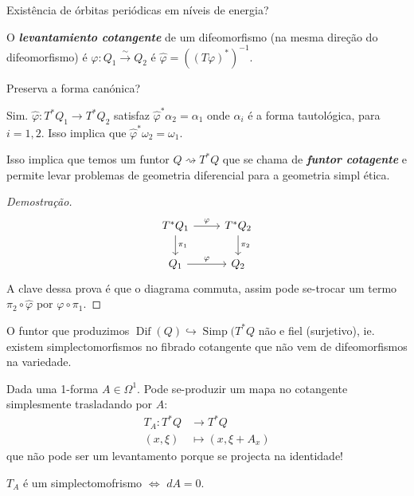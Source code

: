 \begin{question}[Projeto?]
	Exist\^encia de \'orbitas peri\'odicas em n\'iveis de energia?
\end{question}

\begin{defn}
	O \textit{\textbf{levantamiento cotangente}} de um difeomorfismo (na mesma dire\c c\~ao do difeomorfismo) \'e $\varphi:Q_1\overset{\sim}{\to }Q_2$ \'e $\hat{\varphi}=((T\varphi)^{*})^{-1}$.
\end{defn}

\begin{question}
	Preserva a forma can\'onica?
\end{question}

\begin{prop}
	Sim. $\hat{\varphi}:T^*Q_1\to T^*Q_2$ satisfaz $\hat{\varphi}^*\alpha_2=\alpha_1$ onde $\alpha_i$ \'e a forma tautol\'ogica, para $i=1,2$. Isso implica que  $\hat{\varphi}^*\omega_2=\omega_1$.
\end{prop}

Isso implica que temos um funtor $Q\rightsquigarrow T^*Q$ que se chama de \textit{\textbf{funtor cotagente}} e permite levar problemas de geometria diferencial para a geometria simpl \'etica.

\begin{proof}[Demostra\c c\~ao]
	\[\begin{tikzcd}
		T^*Q_1\arrow[r,"\varphi"]\arrow[d,"\pi_1"]&T^*Q_2\arrow[d,"\pi_2"]\\
		Q_1\arrow[r,"\varphi"]&Q_2
	\end{tikzcd}\]
	A clave dessa prova \'e que o diagrama commuta, assim pode se-trocar um termo $\pi_2\circ \hat{\varphi}$ por $\varphi \circ \pi_1$.
\end{proof}

O funtor que produzimos $\operatorname{Dif}(Q)\hookrightarrow \operatorname{Simp }(T^*Q$ n\~ao e fiel (surjetivo), ie. existem simplectomorfismos no fibrado cotangente que n\~ao vem de difeomorfismos na variedade.

\begin{remark}
	Dada uma 1-forma $A\in\Omega^{1}$. Pode se-produzir um mapa no cotangente simplesmente trasladando por $A$:
	\begin{align*}
		T_A: T^*Q &\longrightarrow T^*Q \\
		(x,\xi) &\longmapsto (x,\xi+A_x)
	\end{align*}
	que n\~ao pode ser um levantamento porque se projecta na identidade!

	\begin{exercise}
		$T_A$ \'e um simplectomofrismo $\iff$ $dA=0$.
	\end{exercise}
\end{remark}

